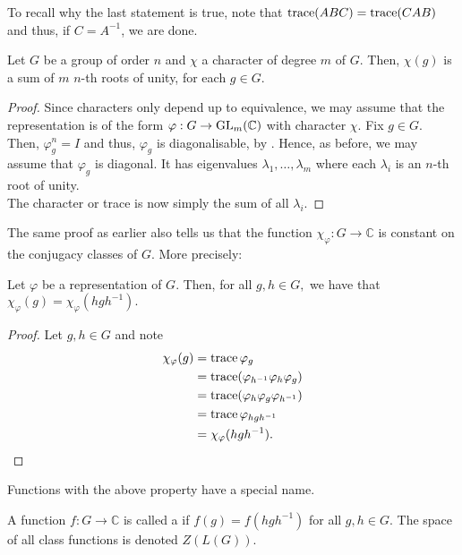 To recall why the last statement is true, note that $\operatorname{trace}(ABC) = \operatorname{trace}(CAB)$ and thus, if $C = A^{-1}$, we are done.

\begin{cor} \label{cor:chargrouprootsunity}
	Let $G$ be a group of order $n$ and $\chi$ a character of degree $m$ of $G.$ Then, $\chi(g)$ is a sum of $m$ $n$-th roots of unity, for each $g \in G.$
\end{cor}
\begin{proof} 
	Since characters only depend up to equivalence, we may assume that the representation is of the form $\varphi : G \to \operatorname{GL}_m(\mathbb{C})$ with character $\chi.$ Fix $g \in G.$ Then, $\varphi_g^n = I$ and thus, $\varphi_g$ is diagonalisable, by . Hence, as before, we may assume that $\varphi_g$ is diagonal. It has eigenvalues $\lambda_1, \ldots, \lambda_m$ where each $\lambda_i$ is an $n$-th root of unity.\\
	The character or trace is now simply the sum of all $\lambda_i.$
\end{proof}

The same proof as earlier also tells us that the function $\chi_\varphi : G \to \mathbb{C}$ is constant on the conjugacy classes of $G.$ More precisely:
\begin{prop} \label{prop:charconstonconjclasses}
	Let $\varphi$ be a representation of $G.$ Then, for all $g, h \in G,$ we have that $\chi_\varphi(g) = \chi_\varphi(hgh^{-1}).$
\end{prop}
\begin{proof} 
	Let $g, h \in G$ and note
	\begin{align*} 
		\chi_\varphi(g) &= \operatorname{trace} \varphi_g\\
		&= \operatorname{trace} (\varphi_{h^{-1}}\varphi_h\varphi_g)\\
		&= \operatorname{trace} (\varphi_h\varphi_g\varphi_{h^{-1}})\\
		&= \operatorname{trace} \varphi_{hgh^{-1}}\\
		&= \chi_\varphi(hgh^{-1}). \qedhere
	\end{align*}
\end{proof}

Functions with the above property have a special name.
\begin{defn}%
	A function $f : G \to \mathbb{C}$ is called a  if $f(g) = f(hgh^{-1})$ for all $g, h \in G.$ The space of all class functions is denoted $Z(L(G)).$
\end{defn}

